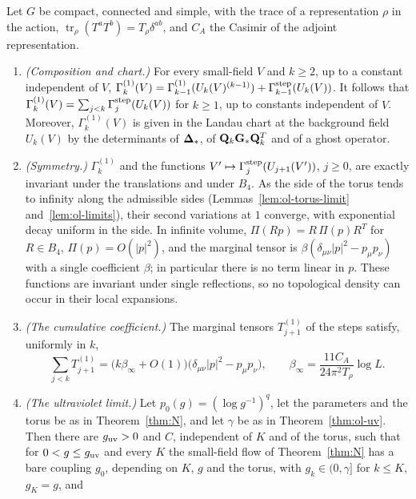 \begin{maintheorem}\label{thm:M}
Let $G$ be compact, connected and simple, with the trace of a representation $\rho$ in the action, $\operatorname{tr}_\rho(T^aT^b)=T_\rho\delta^{ab}$, and $C_A$ the Casimir of the adjoint representation.
\begin{enumerate}[label=(\roman*)]
\item \emph{(Composition and chart.)} For every small-field $V$ and $k\ge2$, up to a constant independent of $V$, $\Gamma^{(1)}_k(V)=\Gamma^{(1)}_{k-1}(U_k(V)^{(k-1)})+\Gamma^{\rm step}_{k-1}(U_k(V))$. It follows that $\Gamma^{(1)}_k(V)=\sum_{j<k}\Gamma^{\rm step}_j(U_k(V))$ for $k\ge1$, up to constants independent of $V$. Moreover, $\Gamma^{(1)}_k(V)$ is given in the Landau chart at the background field $U_k(V)$ by the determinants of $\boldsymbol{\Delta}_*$, of $\mathbf Q_k\mathbf G_*\mathbf Q_k^T$ and of a ghost operator.
\item \emph{(Symmetry.)} $\Gamma^{(1)}_k$ and the functions $V'\mapsto\Gamma^{\rm step}_j(U_{j+1}(V'))$, $j\ge0$, are exactly invariant under the translations and under $B_4$. As the side of the torus tends to infinity along the admissible sides (Lemmas~\ref{lem:ol-torus-limit} and~\ref{lem:ol-limits}), their second variations at $1$ converge, with exponential decay uniform in the side. In infinite volume, $\Pi(Rp)=R\,\Pi(p)R^T$ for $R\in B_4$, $\Pi(p)=O(|p|^2)$, and the marginal tensor is $\beta(\delta_{\mu\nu}|p|^2-p_\mu p_\nu)$ with a single coefficient $\beta$; in particular there is no term linear in $p$. These functions are invariant under single reflections, so no topological density can occur in their local expansions.
\item \emph{(The cumulative coefficient.)} The marginal tensors $T^{(1)}_{j+1}$ of the steps satisfy, uniformly in $k$,
\[
\sum_{j<k}T^{(1)}_{j+1}=\big(k\beta_\infty+O(1)\big)\big(\delta_{\mu\nu}|p|^2-p_\mu p_\nu\big),\qquad\beta_\infty=\frac{11C_A}{24\pi^2T_\rho}\log L .
\]
\item \emph{(The ultraviolet limit.)} Let $p_0(g)=(\log g^{-1})^q$, let the parameters and the torus be as in Theorem~\ref{thm:N}, and let $\gamma$ be as in Theorem~\ref{thm:ol-uv}. Then there are $g_{\rm uv}>0$ and $C$, independent of $K$ and of the torus, such that for $0<g\le g_{\rm uv}$ and every $K$ the small-field flow of Theorem~\ref{thm:N} has a bare coupling $g_0$, depending on $K$, $g$ and the torus, with $g_k\in(0,\gamma]$ for $k\le K$, $g_K=g$, and

\end{enumerate}
\end{maintheorem}
